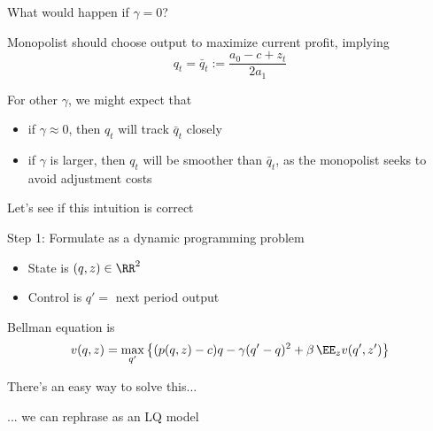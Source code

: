 \begin{frame}
    
    What would happen if $\gamma = 0$?
        \vspace{0.5em}
    
    Monopolist should choose output to maximize current profit, implying 
    \begin{equation*}
        q_t = \bar q_t := \frac{a_0 - c + z_t}{2 a_1}
    \end{equation*}


    For other $\gamma$, we might expect that
    \begin{itemize}
        \item if $\gamma \approx 0$, then $q_t$ will track $\bar q_t$ closely
        \vspace{0.5em}
        \item if $\gamma$ is larger, then $q_t$ will be smoother than $\bar q_t$, as the monopolist seeks to avoid adjustment costs
    \end{itemize}

        \vspace{0.5em}
    Let's see if this intuition is correct
    
\end{frame}


\begin{frame}
    
    Step 1:  Formulate as a dynamic programming problem

        \vspace{0.5em}
    \begin{itemize}
        \item State is $(q, z) \in \RR^2$
        \vspace{0.5em}
        \item Control is $q' = $ next period output
    \end{itemize}
    
        \vspace{0.5em}
    Bellman equation is
    \begin{equation*}
        v(q, z)
        = \max_{q'}
        \left\{
            (p(q, z) - c)q - \gamma (q' - q)^2
            + \beta \, \EE_z v(q', z')
        \right\}
    \end{equation*}


        \vspace{0.5em}
    There's an easy way to solve this...

    ... we can rephrase as an LQ model

\end{frame}




